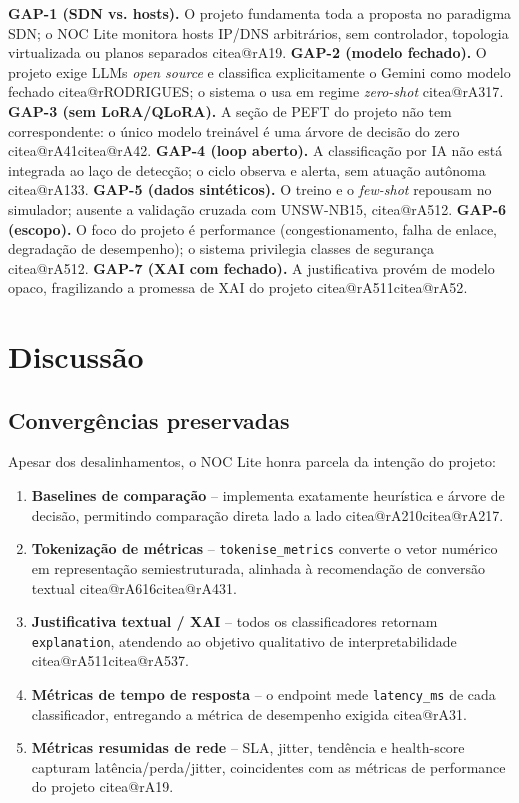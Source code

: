 \documentclass[12pt,a4paper]{article}
\makeatletter
\newcommand{\citea}[1]{\begingroup\edef\@currentlabel{\csname citea@#1\endcsname}\@currentlabel\endgroup}
\makeatother
\begin{document}
\textbf{GAP-1 (SDN vs. hosts).} O projeto fundamenta toda a proposta no
paradigma SDN; o NOC Lite monitora hosts IP/DNS arbitrários, sem controlador,
topologia virtualizada ou planos separados \citea{rA19}. \textbf{GAP-2 (modelo
fechado).} O projeto exige LLMs \textit{open source} e classifica explicitamente
o Gemini como modelo fechado \citea{rRODRIGUES}; o sistema o usa em regime \textit{
zero-shot} \citea{rA317}. \textbf{GAP-3 (sem LoRA/QLoRA).} A seção de PEFT do projeto
não tem correspondente: o único modelo treinável é uma árvore de decisão do
zero \citea{rA41}\citea{rA42}. \textbf{GAP-4 (loop aberto).} A classificação por IA não está
integrada ao laço de detecção; o ciclo observa e alerta, sem atuação autônoma
\citea{rA133}. \textbf{GAP-5 (dados sintéticos).} O treino e o \textit{few-shot}
repousam no simulador; ausente a validação cruzada com UNSW-NB15,
\citea{rA512}. \textbf{GAP-6 (escopo).} O foco do
projeto é performance (congestionamento, falha de enlace, degradação de
desempenho); o sistema privilegia classes de segurança \citea{rA512}. \textbf{GAP-7
(XAI com fechado).} A justificativa provém de modelo opaco, fragilizando a
promessa de XAI do projeto \citea{rA511}\citea{rA52}.

\section{Discussão}
\label{sec:discussao}

\subsection{Convergências preservadas}
\label{sec:convergencias}

Apesar dos desalinhamentos, o NOC Lite honra parcela da intenção do projeto:

\begin{enumerate}
  \item \textbf{Baselines de comparação} -- implementa exatamente heurística e
  árvore de decisão, permitindo comparação direta lado a lado \citea{rA210}\citea{rA217}.
  \item \textbf{Tokenização de métricas} -- \texttt{tokenise\_metrics} converte
  o vetor numérico em representação semiestruturada, alinhada à recomendação de
  conversão textual \citea{rA616}\citea{rA431}.
  \item \textbf{Justificativa textual / XAI} -- todos os classificadores retornam
  \texttt{explanation}, atendendo ao objetivo qualitativo de interpretabilidade
  \citea{rA511}\citea{rA537}.
  \item \textbf{Métricas de tempo de resposta} -- o endpoint mede
  \texttt{latency\_ms} de cada classificador, entregando a métrica de desempenho
  exigida \citea{rA31}.
  \item \textbf{Métricas resumidas de rede} -- SLA, jitter, tendência e
  health-score capturam latência/perda/jitter, coincidentes com as métricas de
  performance do projeto \citea{rA19}.
\end{enumerate}
\end{document}
